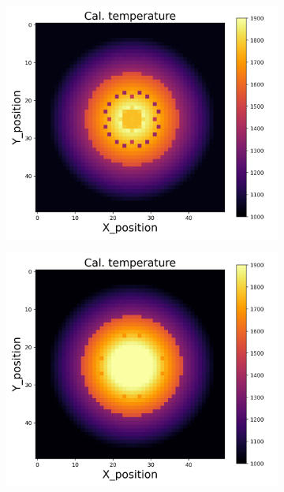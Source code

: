 {\begin{figure}[p]
\begin{minipage}{\textwidth}
\begin{subfigure}{0.325\textwidth}
        \end{subfigure}
        \begin{subfigure}{0.325\textwidth}
            \centering
            \includegraphics[width=\textwidth]{figures/raw_data/23/linear/T_cal.jpg}
        \end{subfigure}
        \begin{subfigure}{0.325\textwidth}
            \centering
            \includegraphics[width=\textwidth]{figures/raw_data/24/linear/T_cal.jpg}

\end{subfigure}
\end{minipage}
\end{figure}}
